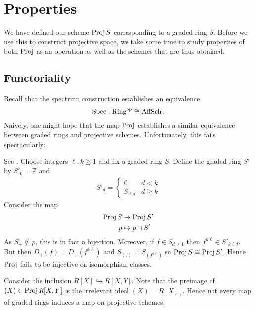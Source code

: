 \documentclass{article}
\begin{document}
\section{Properties}

We have defined our scheme $\operatorname{Proj} S$ corresponding to a
graded ring $S$. Before we use this to construct projective space,
we take some time to study properties of both $\operatorname{Proj}$ as an operation
as well as the schemes that are thus obtained.

\subsection{Functoriality}

Recall that the spectrum construction establishes an equivalence
\begin{align*}
  \operatorname{Spec} : {\operatorname{Ring}}^\text{op} \cong \operatorname{AffSch}.
\end{align*}
Naively, one might hope that the map $\operatorname{Proj}$ establishes a similar
equivalence between graded rings and projective schemes. Unfortunately,
this fails spectacularly:

\begin{example}\label{ex:proj_not_injective}
  See \cite[Remark 13.7]{gortz2010}.
  Choose integers $\ell,k\geq 1$ and fix a graded ring $S$.
  Define the graded ring $S'$ by $S'_0 = \mathbb{Z}$ and
  \begin{align*}
    S'_d = \begin{cases}
      0 & d<k\\
      S_{\ell d} & d\geq k
    \end{cases}
  \end{align*}
  Consider the map
  \begin{align*}
    \operatorname{Proj} S &\to \operatorname{Proj} S' \\
    p &\mapsto p\cap S'
  \end{align*}
  As $S_+\not\subseteq p$, this is in fact a bijection. Moreover,
  if $f\in S_{d\geq 1}$ then $f^{k\ell}\in S'_{k\ell d}$. But then
  $D_+(f)=D_+(f^{k\ell})$ and $S_{(f)}=S_{(f^{k\ell})}$ so
  $\operatorname{Proj} S \cong \operatorname{Proj} S'$. Hence $\operatorname{Proj}$ fails to be injective
  on isomorphism classes.
\end{example}

\begin{example}\label{ex:no_induced_map}
  Consider the inclusion $R[X]\hookrightarrow R[X,Y]$. Note that
  the preimage of $(X)\in\operatorname{Proj} R[X,Y]$ is the irrelevant ideal
  $(X)=R[X]_+$. Hence not every map of graded rings induces a
  map on projective schemes.
\end{example}
\end{document}
